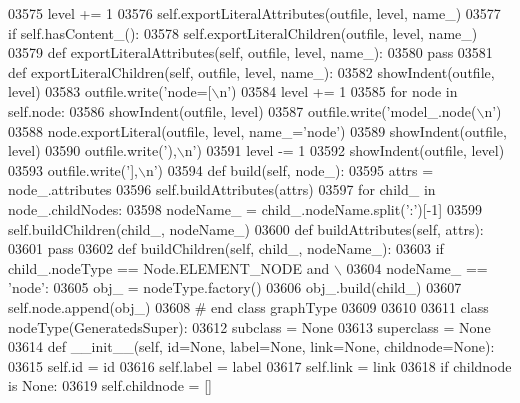 \begin{DoxyCode}
{{{{{{{{{{{{{{{{{{{{{{{{{{{{{{{{{{{{{{{{{{{{{{{{{{{{{{{{{{{{{{{{{{{{{{{{{{{{{{{{{{{{{{{{{{{{{{{{{{{{{{{{{{{{{{{{{{{{{{{{{{{{{{{{{{{{{{{{{{{{{{{{{{{{{{{{{{{{{{{{{{{{{{{{{{{{{{{{{{{{{{{{{{{{{{{{{{{{{{{{{{{{{{{{{{{{{{{{{{{{{{{{{{{{{{{{03575         level += 1
03576         self.exportLiteralAttributes(outfile, level, name\_)
03577         \textcolor{keywordflow}{if} self.hasContent_():
03578             self.exportLiteralChildren(outfile, level, name\_)
03579     \textcolor{keyword}{def }exportLiteralAttributes(self, outfile, level, name\_):
03580         \textcolor{keywordflow}{pass}
03581     \textcolor{keyword}{def }exportLiteralChildren(self, outfile, level, name\_):
03582         showIndent(outfile, level)
03583         outfile.write(\textcolor{stringliteral}{'node=[\(\backslash\)n'})
03584         level += 1
03585         \textcolor{keywordflow}{for} node \textcolor{keywordflow}{in} self.node:
03586             showIndent(outfile, level)
03587             outfile.write(\textcolor{stringliteral}{'model\_.node(\(\backslash\)n'})
03588             node.exportLiteral(outfile, level, name\_=\textcolor{stringliteral}{'node'})
03589             showIndent(outfile, level)
03590             outfile.write(\textcolor{stringliteral}{'),\(\backslash\)n'})
03591         level -= 1
03592         showIndent(outfile, level)
03593         outfile.write(\textcolor{stringliteral}{'],\(\backslash\)n'})
03594     \textcolor{keyword}{def }build(self, node\_):
03595         attrs = node\_.attributes
03596         self.buildAttributes(attrs)
03597         \textcolor{keywordflow}{for} child\_ \textcolor{keywordflow}{in} node\_.childNodes:
03598             nodeName\_ = child\_.nodeName.split(\textcolor{stringliteral}{':'})[-1]
03599             self.buildChildren(child\_, nodeName\_)
03600     \textcolor{keyword}{def }buildAttributes(self, attrs):
03601         \textcolor{keywordflow}{pass}
03602     \textcolor{keyword}{def }buildChildren(self, child\_, nodeName\_):
03603         \textcolor{keywordflow}{if} child\_.nodeType == Node.ELEMENT\_NODE \textcolor{keywordflow}{and} \(\backslash\)
03604             nodeName\_ == \textcolor{stringliteral}{'node'}:
03605             obj\_ = nodeType.factory()
03606             obj\_.build(child\_)
03607             self.node.append(obj\_)
03608 \textcolor{comment}{# end class graphType}
03609 
03610 
03611 \textcolor{keyword}{class }nodeType(GeneratedsSuper):
03612     subclass = \textcolor{keywordtype}{None}
03613     superclass = \textcolor{keywordtype}{None}
03614     \textcolor{keyword}{def }__init__(self, id=None, label=None, link=None, childnode=None):
03615         self.id = id
03616         self.label = label
03617         self.link = link
03618         \textcolor{keywordflow}{if} childnode \textcolor{keywordflow}{is} \textcolor{keywordtype}{None}:
03619             self.childnode = []
}}}}}}}}}}}}}}}}}}}}}}}}}}}}}}}}}}}}}}}}}}}}}}}}}}}}}}}}}}}}}}}}}}}}}}}}}}}}}}}}}}}}}}}}}}}}}}}}}}}}}}}}}}}}}}}}}}}}}}}}}}}}}}}}}}}}}}}}}}}}}}}}}}}}}}}}}}}}}}}}}}}}}}}}}}}}}}}}}}}}}}}}}}}}}}}}}}}}}}}}}}}}}}}}}}}}}}}}}}}}}}}}}}}}}}}}
\end{DoxyCode}
